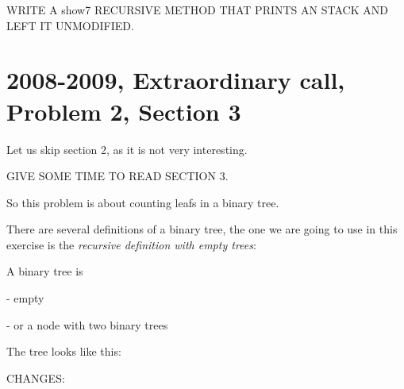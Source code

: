 \documentclass[a4paper, 9pt]{extarticle}
\begin{document}
WRITE A show7 RECURSIVE METHOD THAT PRINTS AN STACK AND LEFT IT UNMODIFIED.

\begin{multicols}{2}
\columnbreak
{}
\end{multicols}









\newpage

\section{2008-2009, Extraordinary call, Problem 2, Section 3}

Let us skip section 2, as it is not very interesting.

GIVE SOME TIME TO READ SECTION 3.

So this problem is about counting leafs in a binary tree.

There are several definitions of a binary tree, the one we are going to use in this
exercise is the \emph{recursive definition with empty trees}:

\begin{blackboard}
A binary tree is

  - empty

  - or a node with two binary trees
\end{blackboard}

The tree looks like this:

\begin{multicols}{2}
\end{multicols}

CHANGES:
\end{document}
